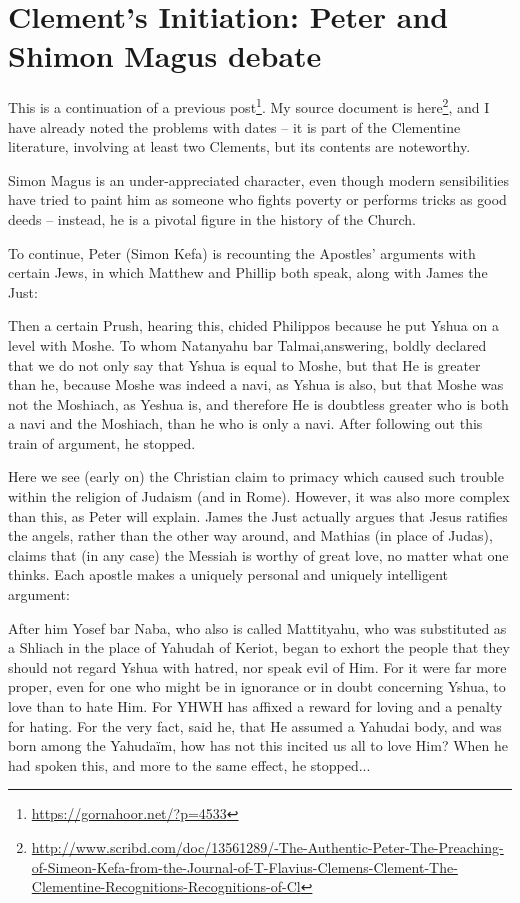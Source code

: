 \section{Clement’s Initiation: Peter and Shimon Magus debate}

This is a continuation of a previous post\footnote{\url{https://gornahoor.net/?p=4533}}. My source document is here\footnote{\url{http://www.scribd.com/doc/13561289/-The-Authentic-Peter-The-Preaching-of-Simeon-Kefa-from-the-Journal-of-T-Flavius-Clemens-Clement-The-Clementine-Recognitions-Recognitions-of-Cl}}, and I have already noted the problems with dates -- it is part of the Clementine literature, involving at least two Clements, but its contents are noteworthy.

Simon Magus is an under-appreciated character, even though modern sensibilities have tried to paint him as someone who fights poverty or performs tricks as good deeds -- instead, he is a pivotal figure in the history of the Church.

To continue, Peter (Simon Kefa) is recounting the Apostles' arguments with certain Jews, in which Matthew and Phillip both speak, along with James the Just:

\begin{quotex}
Then a certain Prush, hearing this, chided Philippos because he put Yshua on a level with Moshe. To whom Natanyahu bar Talmai,answering, boldly declared that we do not only say that Yshua is equal to Moshe, but that He is greater than he, because Moshe was indeed a navi, as Yshua is also, but that Moshe was not the Moshiach, as Yeshua is, and therefore He is doubtless greater who is both a navi and the Moshiach, than he who is only a navi. After following out this train of argument, he stopped.
\end{quotex}

Here we see (early on) the Christian claim to primacy which caused such trouble within the religion of Judaism (and in Rome). However, it was also more complex than this, as Peter will explain. James the Just actually argues that Jesus ratifies the angels, rather than the other way around, and Mathias (in place of Judas), claims that (in any case) the Messiah is worthy of great love, no matter what one thinks. Each apostle makes a uniquely personal and uniquely intelligent argument:

\begin{quotex}
After him Yosef bar Naba, who also is called Mattityahu, who was substituted as a Shliach in the place of Yahudah of Keriot, began to exhort the people that they should not regard Yshua with hatred, nor speak evil of Him. For it were far more proper, even for one who might be in ignorance or in doubt concerning Yshua, to love than to hate Him. For YHWH has affixed a reward for loving and a penalty for hating. For the very fact, said he, that He assumed a Yahudai body, and was born among the Yahudaïm, how has not this incited us all to love Him? When he had spoken this, and more to the same effect, he stopped... 
\end{quotex}



